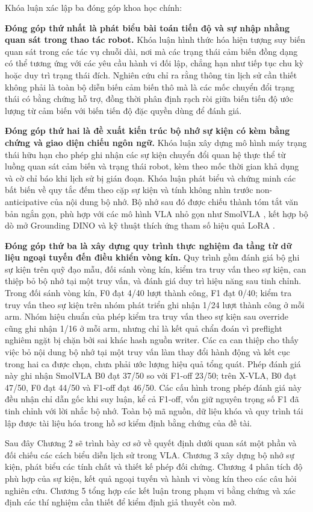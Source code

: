Khóa luận xác lập ba đóng góp khoa học chính:

\textbf{Đóng góp thứ nhất là phát biểu bài toán tiến độ và sự nhập nhằng quan sát trong thao tác robot.} Khóa luận hình thức hóa hiện tượng suy biến quan sát trong các tác vụ chuỗi dài, nơi mà các trạng thái cảm biến đồng dạng có thể tương ứng với các yêu cầu hành vi đối lập, chẳng hạn như tiếp tục chu kỳ hoặc duy trì trạng thái đích. Nghiên cứu chỉ ra rằng thông tin lịch sử cần thiết không phải là toàn bộ diễn biến cảm biến thô mà là các mốc chuyển đổi trạng thái có bằng chứng hỗ trợ, đồng thời phân định rạch ròi giữa biến tiến độ ước lượng từ cảm biến với biến tiến độ đặc quyền dùng để đánh giá.

\textbf{Đóng góp thứ hai là đề xuất kiến trúc bộ nhớ sự kiện có kèm bằng chứng và giao diện chiếu ngôn ngữ.} Khóa luận xây dựng mô hình máy trạng thái hữu hạn cho phép ghi nhận các sự kiện chuyển đổi quan hệ thực thể từ luồng quan sát cảm biến và trạng thái robot, kèm theo mốc thời gian khả dụng và cờ chỉ báo khi lịch sử bị gián đoạn. Khóa luận phát biểu và chứng minh các bất biến về quy tắc đếm theo cặp sự kiện và tính không nhìn trước non-anticipative của nội dung bộ nhớ. Bộ nhớ sau đó được chiếu thành tóm tắt văn bản ngắn gọn, phù hợp với các mô hình VLA nhỏ gọn như SmolVLA \cite{smolvla2025}, kết hợp bộ dò mở Grounding DINO \cite{groundingdino2024} và kỹ thuật thích ứng tham số hiệu quả LoRA \cite{lora2021}.

\textbf{Đóng góp thứ ba là xây dựng quy trình thực nghiệm đa tầng từ dữ liệu ngoại tuyến đến điều khiển vòng kín.} Quy trình gồm đánh giá bộ ghi sự kiện trên quỹ đạo mẫu, đối sánh vòng kín, kiểm tra truy vấn theo sự kiện, can thiệp bỏ bộ nhớ tại một truy vấn, và đánh giá duy trì hiệu năng sau tinh chỉnh. Trong đối sánh vòng kín, F0 đạt 4/40 lượt thành công, F1 đạt 0/40; kiểm tra truy vấn theo sự kiện trên nhóm phát triển ghi nhận 1/24 lượt thành công ở mỗi arm. Nhóm hiệu chuẩn của phép kiểm tra truy vấn theo sự kiện sau override cũng ghi nhận 1/16 ở mỗi arm, nhưng chỉ là kết quả chẩn đoán vì preflight nghiêm ngặt bị chặn bởi sai khác hash nguồn writer. Các ca can thiệp cho thấy việc bỏ nội dung bộ nhớ tại một truy vấn làm thay đổi hành động và kết cục trong hai ca được chọn, chưa phải ước lượng hiệu quả tổng quát. Phép đánh giá này ghi nhận SmolVLA B0 đạt 37/50 so với F1-off 23/50; trên X-VLA, B0 đạt 47/50, F0 đạt 44/50 và F1-off đạt 46/50. Các cấu hình trong phép đánh giá này đều nhận chỉ dẫn gốc khi suy luận, kể cả F1-off, vốn giữ nguyên trọng số F1 đã tinh chỉnh với lời nhắc bộ nhớ. Toàn bộ mã nguồn, dữ liệu khóa và quy trình tái lập được tài liệu hóa trong hồ sơ kiểm định bằng chứng của đề tài.

Sau đây Chương 2 sẽ trình bày cơ sở về quyết định dưới quan sát một phần và đối chiếu các cách biểu diễn lịch sử trong VLA. Chương 3 xây dựng bộ nhớ sự kiện, phát biểu các tính chất và thiết kế phép đối chứng. Chương 4 phân tích độ phù hợp của sự kiện, kết quả ngoại tuyến và hành vi vòng kín theo các câu hỏi nghiên cứu. Chương 5 tổng hợp các kết luận trong phạm vi bằng chứng và xác định các thí nghiệm cần thiết để kiểm định giả thuyết còn mở.

